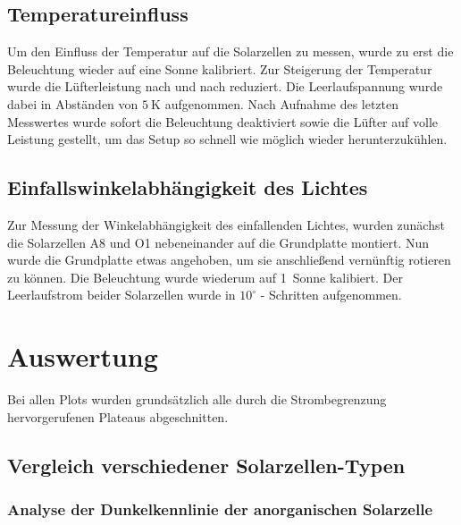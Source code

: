 \documentclass[slug=SZ, room=Hermann-Krone-Bau\,\ Labor\ 1.25, supervisor=Martin\ Kroll]{../../Lab_Report_LaTeX/lab_report}
\newcommand{\sun}[1]{\SI{#1}{Sonne}}
\begin{document}
\subsection{Temperatureinfluss}
\label{sec:tempeinfl}

Um den Einfluss der Temperatur auf die Solarzellen zu messen, wurde zu erst die Beleuchtung
wieder auf eine Sonne kalibriert. Zur Steigerung der Temperatur wurde die Lüfterleistung
nach und nach reduziert. Die Leerlaufspannung wurde dabei in Abständen von \(\SI{5}{\kelvin}\)
aufgenommen. Nach Aufnahme des letzten Messwertes wurde sofort die Beleuchtung deaktiviert
sowie die Lüfter auf volle Leistung gestellt, um das Setup so schnell wie möglich wieder
herunterzukühlen.

\subsection{Einfallswinkelabhängigkeit des Lichtes}
\label{sec:einfwink}

Zur Messung der Winkelabhängigkeit des einfallenden Lichtes, wurden zunächst die Solarzellen
A8 und O1 nebeneinander auf die Grundplatte montiert. Nun wurde die Grundplatte
etwas angehoben, um sie anschließend vernünftig rotieren zu
können. Die Beleuchtung wurde wiederum auf \sun{1} kalibiert.
Der Leerlaufstrom beider Solarzellen wurde in \(10^\circ\) - Schritten aufgenommen.


\section{Auswertung}
\label{sec:auswert}
Bei allen Plots wurden grunds\"atzlich alle durch die Strombegrenzung
hervorgerufenen Plateaus abgeschnitten.

\subsection{Vergleich verschiedener Solarzellen-Typen}
\label{sec:aussoztyp}

\subsubsection{Analyse der Dunkelkennlinie der anorganischen
  Solarzelle}
\label{sec:anordunkel}
\end{document}
